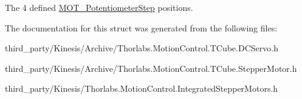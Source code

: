 The 4 defined \hyperlink{struct_m_o_t___potentiometer_step}{M\+O\+T\+\_\+\+Potentiometer\+Step} positions. 



The documentation for this struct was generated from the following files\+:\begin{DoxyCompactItemize}
\item 
third\+\_\+party/\+Kinesis/\+Archive/Thorlabs.\+Motion\+Control.\+T\+Cube.\+D\+C\+Servo.\+h\item 
third\+\_\+party/\+Kinesis/\+Archive/Thorlabs.\+Motion\+Control.\+T\+Cube.\+Stepper\+Motor.\+h\item 
third\+\_\+party/\+Kinesis/Thorlabs.\+Motion\+Control.\+Integrated\+Stepper\+Motors.\+h\end{DoxyCompactItemize}
